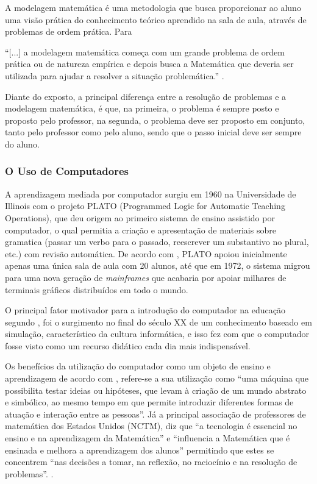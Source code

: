 A modelagem matemática é uma metodologia que busca proporcionar ao aluno uma visão prática do conhecimento teórico aprendido na sala de aula, através de problemas de ordem prática. Para 
\begin{citacao}
``[...] a modelagem matemática começa com um grande problema de ordem prática ou de natureza empírica e depois busca a Matemática que deveria ser utilizada para ajudar a resolver a situação problemática.'' \cite[p.~15]{fossa1998tendencias}.
\end{citacao}

Diante do exposto, a principal diferença entre a resolução de problemas e a modelagem matemática, é que, na primeira, o problema é sempre posto e proposto pelo professor, na segunda, o problema deve ser proposto em conjunto, tanto pelo professor como pelo aluno, sendo que o passo inicial deve ser sempre do aluno.

\subsubsection{O Uso de Computadores}

A aprendizagem mediada por computador surgiu em 1960 na Universidade de Illinois com o projeto PLATO (Programmed Logic for Automatic Teaching Operations)\cite{bitzer1961plato}, que deu origem ao primeiro sistema de ensino assistido por computador, o qual permitia a criação e apresentação de materiais sobre gramatica (passar um verbo para o passado, reescrever um substantivo no plural, etc.) com revisão automática. De acordo com , PLATO apoiou inicialmente apenas uma única sala de aula com 20 alunos, até que em 1972, o sistema migrou para uma nova geração de \textit{mainframes} que acabaria por apoiar milhares de terminais gráficos distribuídos em todo o mundo.

O principal fator motivador para a introdução do computador na educação segundo , foi o surgimento no final do século XX de um conhecimento baseado em simulação, característico da cultura informática, e isso fez com que o computador fosse visto como  um recurso didático cada dia mais indispensável.

Os benefícios da utilização do computador como um objeto de ensino e aprendizagem de acordo com , refere-se a sua utilização como ``uma máquina que possibilita testar ideias ou hipóteses, que levam à criação de um mundo abstrato e simbólico, ao mesmo tempo em que permite introduzir diferentes formas de atuação e interação entre as pessoas''. Já a principal associação de professores de matemática dos Estados Unidos (NCTM), diz que ``a tecnologia é essencial no ensino e na aprendizagem da Matemática'' e ``influencia a Matemática que é ensinada e melhora a aprendizagem dos alunos'' permitindo que estes se concentrem ``nas decisões a tomar, na reflexão, no raciocínio e na resolução de problemas''. \cite[p.26]{melo2007principios}.

